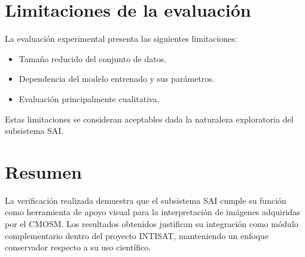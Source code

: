 \section{Limitaciones de la evaluación}

La evaluación experimental presenta las siguientes limitaciones:

\begin{itemize}
    \item Tamaño reducido del conjunto de datos.
    \item Dependencia del modelo entrenado y sus parámetros.
    \item Evaluación principalmente cualitativa.
\end{itemize}

Estas limitaciones se consideran aceptables dada la naturaleza exploratoria del
subsistema SAI.

\section{Resumen}

La verificación realizada demuestra que el subsistema SAI cumple su función como
herramienta de apoyo visual para la interpretación de imágenes adquiridas por el
CMOSM. Los resultados obtenidos justifican su integración como módulo
complementario dentro del proyecto INTISAT, manteniendo un enfoque conservador
respecto a su uso científico.

